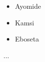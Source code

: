 \documentclass{article}
\begin{document}
	\begin{itemize}
		\item Ayomide
		\item Kamsi
		\item Eboseta
	\end{itemize}...
\end{document}
